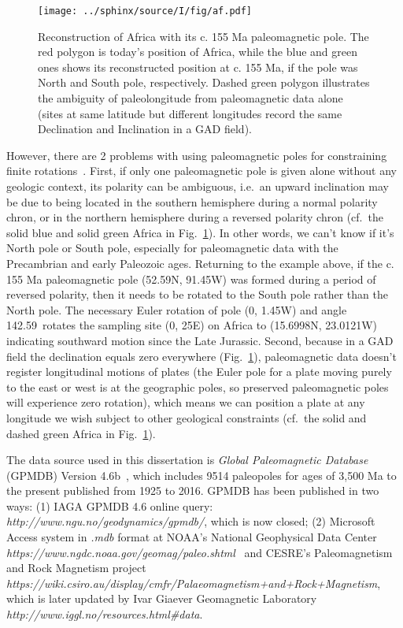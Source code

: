 \begin{figure}
  \centering
    \texttt{[image: ../sphinx/source/I/fig/af.pdf]}
  \captionsetup{width=.95\textwidth}
  \caption{Reconstruction of Africa with its c. 155 Ma paleomagnetic pole. The
  red polygon is today's position of Africa, while the blue and green ones shows
  its reconstructed position at c. 155 Ma, if the pole was North and South pole,
  respectively. Dashed green polygon illustrates the ambiguity of paleolongitude
  from paleomagnetic data alone (sites at same latitude but different longitudes
  record the same Declination and Inclination in a GAD
  field).}\label{Fig:chap_intro_reconstructpole}
\end{figure}

However, there are 2 problems with using paleomagnetic poles for constraining
finite rotations~\citep{T19}. First, if only one paleomagnetic pole is
given alone without any geologic context, its polarity can be ambiguous, i.e.\
an upward inclination may be due to being located in the southern hemisphere
during a normal polarity chron, or in the northern hemisphere during a reversed
polarity chron (cf.\ the solid blue and solid green Africa in Fig.~\ref{Fig:chap_intro_reconstructpole}). In other words, we can't know if it's North pole
or South pole, especially for paleomagnetic data with the Precambrian and early
Paleozoic ages. Returning to the example above, if the c. 155 Ma paleomagnetic
pole (52.59\degree{}N, 91.45\degree{}W) was formed during a period of reversed polarity, then
it needs to be rotated to the South pole rather than the North pole. The
necessary Euler rotation of pole (0\degree, 1.45\degree{}W) and angle
142.59\degree\ rotates the sampling site (0\degree, 25\degree{}E) on Africa to
(15.6998\degree{}N, 23.0121\degree{}W) indicating
southward motion since the Late Jurassic. Second, because in a GAD field the
declination equals zero everywhere (Fig.~\ref{Fig:chap_intro_reconstructpole}),
paleomagnetic data doesn't register longitudinal motions of plates (the Euler
pole for a plate moving purely to the east or west is at the geographic poles,
so preserved paleomagnetic poles will experience zero rotation), which means we
can position a plate at any longitude we wish subject to other geological
constraints (cf.\ the solid and dashed green Africa in Fig.~\ref{Fig:chap_intro_reconstructpole}).

The data source used in this dissertation is \emph{Global Paleomagnetic
Database} (GPMDB) Version 4.6b~\cite[updated in 2016 by the Ivar Giaever
Geomagnetic Laboratory team, in collaboration with Pisarevsky]{P05}, which
includes 9514 paleopoles for ages of 3,500 Ma to the present published from 1925
to 2016. GPMDB has been published in two ways: (1) IAGA GPMDB 4.6 online query:
\emph{http://www.ngu.no/geodynamics/gpmdb/}, which is now closed; (2) Microsoft
Access system in \emph{.mdb} format at NOAA's National Geophysical Data Center
\emph{https://www.ngdc.noaa.gov/geomag/paleo.shtml}~\citep{P03}
and CESRE's Paleomagnetism and Rock Magnetism project
\emph{https://wiki.csiro.au/display/cmfr/Palaeomagnetism+and+Rock+Magnetism},
which is later updated by Ivar Giaever Geomagnetic Laboratory
\emph{http://www.iggl.no/resources.html\#data}.

